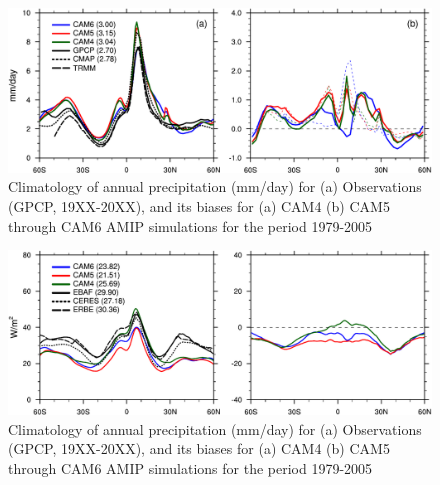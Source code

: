 \clearpage
\begin{figure}[t]
  \begin{center}
    \includegraphics[width=1.\textwidth,angle=0.]{./figs/f_PRECT_1D_JJA_CAM456.pdf}
  \end{center}
  \caption{Climatology of annual precipitation (mm/day) for (a) Observations (GPCP, 19XX-20XX), and its biases for (a) CAM4 (b) CAM5  through CAM6 AMIP simulations for the period 1979-2005} 
\label{f_PRECT_1D_JJA_CAM456}
\end{figure} 


\clearpage
\begin{figure}[t]
    \includegraphics[width=1.\textwidth,angle=0.]{./figs/f_LWCF_1D_ANN_CAM456.pdf}
  \caption{Climatology of annual precipitation (mm/day) for (a) Observations (GPCP, 19XX-20XX), and its biases for (a) CAM4 (b) CAM5  through CAM6 AMIP simulations for the period 1979-2005} 
\label{f_LWCF_1D_ANN_CAM456}
\end{figure} 

